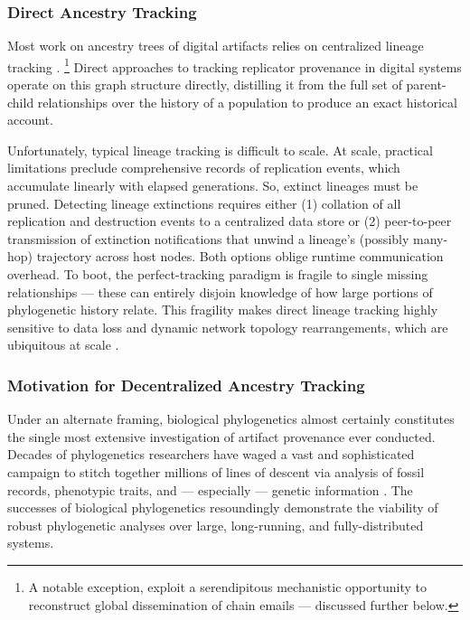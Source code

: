 \subsubsection{Direct Ancestry Tracking}

Most work on ancestry trees of digital artifacts relies on centralized lineage tracking \citep{friggeri2014rumor,cohen1987computer,dolson2023phylotrackpy}.%
\footnote{A notable exception, \cite{libennowell2008tracing} exploit a serendipitous mechanistic opportunity to reconstruct global dissemination of chain emails --- discussed further below.}
Direct approaches to tracking replicator provenance in digital systems operate on this graph structure directly, distilling it from the full set of parent-child relationships over the history of a population to produce an exact historical account.

Unfortunately, typical lineage tracking is difficult to scale.
At scale, practical limitations preclude comprehensive records of replication events, which accumulate linearly with elapsed generations.
So, extinct lineages must be pruned.
Detecting lineage extinctions requires either (1) collation of all replication and destruction events to a centralized data store or (2) peer-to-peer transmission of extinction notifications that unwind a lineage's (possibly many-hop) trajectory across host nodes.
Both options oblige runtime communication overhead.
To boot, the perfect-tracking paradigm is fragile to single missing relationships --- these can entirely disjoin knowledge of how large portions of phylogenetic history relate.
This fragility makes direct lineage tracking highly sensitive to data loss and dynamic network topology rearrangements, which are ubiquitous at scale \citep{cappello2014toward,ackley2011pursue}.

\subsubsection{Motivation for Decentralized Ancestry Tracking}

Under an alternate framing, biological phylogenetics almost certainly constitutes the single most extensive investigation of artifact provenance ever conducted.
Decades of phylogenetics researchers have waged a vast and sophisticated campaign to stitch together millions of lines of descent via analysis of fossil records, phenotypic traits, and --- especially --- genetic information \citep{hinchliff2015synthesis,lee2015morphological}.
The successes of biological phylogenetics resoundingly demonstrate the viability of robust phylogenetic analyses over large, long-running, and fully-distributed systems.

